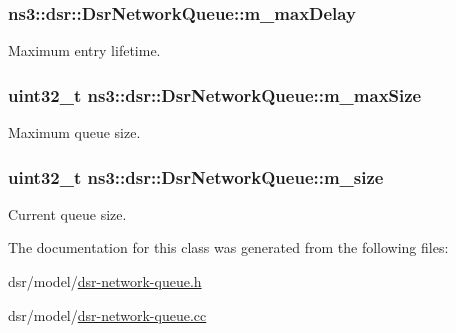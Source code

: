 \subsubsection[{\texorpdfstring{m\+\_\+max\+Delay}{m_maxDelay}}]{ ns3\+::dsr\+::\+Dsr\+Network\+Queue\+::m\+\_\+max\+Delay\hspace{0.3cm}{\ttfamily [private]}}\hypertarget{classns3_1_1dsr_1_1DsrNetworkQueue_a748852e9a67017c0acb680d793f200ea}{}\label{classns3_1_1dsr_1_1DsrNetworkQueue_a748852e9a67017c0acb680d793f200ea}


Maximum entry lifetime. 

\subsubsection[{\texorpdfstring{m\+\_\+max\+Size}{m_maxSize}}]{\setlength{\rightskip}{0pt plus 5cm}uint32\+\_\+t ns3\+::dsr\+::\+Dsr\+Network\+Queue\+::m\+\_\+max\+Size\hspace{0.3cm}{\ttfamily [private]}}\hypertarget{classns3_1_1dsr_1_1DsrNetworkQueue_a0865236d83a6d50314a5ce3fbcff46ec}{}\label{classns3_1_1dsr_1_1DsrNetworkQueue_a0865236d83a6d50314a5ce3fbcff46ec}


Maximum queue size. 

\subsubsection[{\texorpdfstring{m\+\_\+size}{m_size}}]{\setlength{\rightskip}{0pt plus 5cm}uint32\+\_\+t ns3\+::dsr\+::\+Dsr\+Network\+Queue\+::m\+\_\+size\hspace{0.3cm}{\ttfamily [private]}}\hypertarget{classns3_1_1dsr_1_1DsrNetworkQueue_aa92eb801ab54d5f15b86d67c77692b55}{}\label{classns3_1_1dsr_1_1DsrNetworkQueue_aa92eb801ab54d5f15b86d67c77692b55}


Current queue size. 



The documentation for this class was generated from the following files\+:\begin{DoxyCompactItemize}
\item 
dsr/model/\hyperlink{dsr-network-queue_8h}{dsr-\/network-\/queue.\+h}\item 
dsr/model/\hyperlink{dsr-network-queue_8cc}{dsr-\/network-\/queue.\+cc}\end{DoxyCompactItemize}
